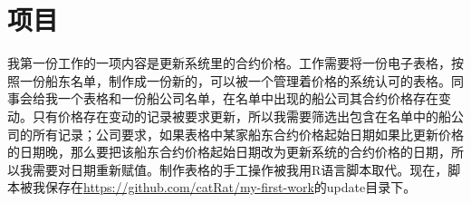 \section{项目}
我第一份工作的一项内容是更新系统里的合约价格。工作需要将一份电子表格，按照一份船东名单，制作成一份新的，可以被一个管理着价格的系统认可的表格。同事会给我一个表格和一份船公司名单，在名单中出现的船公司其合约价格存在变动。只有价格存在变动的记录被要求更新，所以我需要筛选出包含在名单中的船公司的所有记录；公司要求，如果表格中某家船东合约价格起始日期如果比更新价格的日期晚，那么要把该船东合约价格起始日期改为更新系统的合约价格的日期，所以我需要对日期重新赋值。制作表格的手工操作被我用R语言脚本取代。现在，脚本被我保存在\url{https://github.com/catRat/my-first-work}的update目录下。